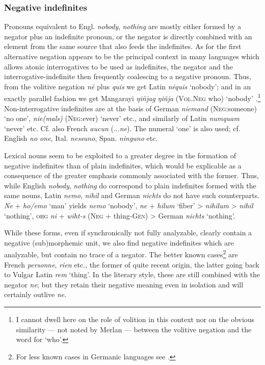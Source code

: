 \subsubsection{Negative indefinites} \label{sec:3.2.2.3}
Pronouns equivalent to Engl. \textit{nobody}, \textit{nothing} are mostly either formed by a negator plus an indefinite pronoun, or the negator is directly combined with an element from the same source that also feeds the indefinites. As for the first alternative negation appears to be the principal context in many languages which allows atonic interrogatives to be used as indefinites, the negator and the interrogative-indefinite then frequently coalescing to a negative pronoun. Thus, from the volitive negation \textit{n\=e} plus \textit{quis} we get Latin \textit{n\=equis} ‘nobody’; and in an exactly parallel fashion we get Mangarayi \textit{ŋiñjag ŋiñja} (\textsc{Vol.Neg} who) ‘nobody’ \citep[36, 119]{Merlan1982}.\footnote{I cannot dwell here on the role of volition in this context nor on the obvious similarity — not noted by Merlan — between the volitive negation and the word for ‘who’.} Non-interrogative indefinites are at the basis of German \textit{niemand} (\textsc{Neg}:someone) ‘no one’, \textit{nie(mals)} (\textsc{Neg}:ever) ‘never’ etc., and similarly of Latin \textit{numquam} ‘never’ etc. Cf. also French \textit{aucun} (...\textit{ne}). The numeral ‘one’ is also used; cf. English \textit{no one}, Ital. \textit{nessuno}, Span. \textit{ninguno} etc.

Lexical nouns seem to be exploited to a greater degree in the formation of negative indefinites than of plain indefinites, which would be explicable as a consequence of the greater emphasis commonly associated with the former. Thus, while English \textit{nobody}, \textit{nothing} do correspond to plain indefinites formed with the same nouns, Latin \textit{nemo}, \textit{nihil} and German \textit{nichts} do not have such counterparts. \textit{Ne} + \textit{ho/emo} ‘man’ yields \textit{nemo} ‘nobody’, \textit{ne} + \textit{hilum} ‘fiber’ {\textgreater} \textit{nihilum} {\textgreater} \textit{nihil} ‘nothing’, \textsc{ohg} \textit{ni} + \textit{wiht-s} (\textsc{Neg} + thing-\textsc{Gen}) {\textgreater} German \textit{nichts} ‘nothing’.

While these forms, even if synchronically not fully analyzable, clearly contain a negative (sub)morphemic unit, we also find negative indefinites which are analyzable, but contain no trace of a negator. The better known cases\footnote{For less known cases in Germanic languages see \citealt[73]{Krahe1967}.} are French \textit{personne}, \textit{rien} etc., the former of quite recent origin, the latter going back to Vulgar Latin \textit{rem} ‘thing’. In the literary style, these are still combined with the negator \textit{ne}; but they retain their negative meaning even in isolation and will certainly outlive \textit{ne}.

